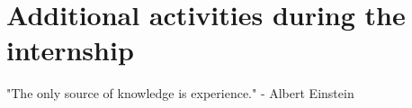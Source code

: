 \chapter{Additional activities during the internship}
\label{chapter:Additional activities during the internship}

\begin{introduction}
    "The only source of knowledge is experience." - Albert Einstein
\end{introduction}


